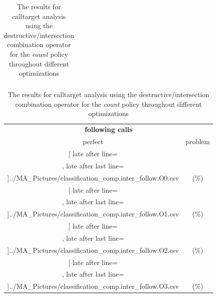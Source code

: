\begin{table}[!htbp]
{\begin{tabular}{l|c|c|c}
    	\end{tabular}

	\begin{tabular}{|c|c}%

	\toprule
    \multicolumn{2}{c}{\bfseries following calls}\\
	
	     perfect &  problem %
	\\\midrule
	\csvreader[ late after line=\\, late after last line=\\\midrule]{../MA_Pictures/classification_comp.inter_follow.O0.csv}{
}
	{\csvcolxiii (\csvcolxiv \%) & \csvcolxv (\csvcolxvi \%)}%
\multicolumn{1}{c}{}

	\\\midrule
	\csvreader[ late after line=\\, late after last line=\\\midrule]{../MA_Pictures/classification_comp.inter_follow.O1.csv}{
}
	{\csvcolxiii (\csvcolxiv \%) & \csvcolxv (\csvcolxvi \%)}%
	
	\multicolumn{1}{c}{}

	\\\midrule
	\csvreader[ late after line=\\, late after last line=\\\midrule]{../MA_Pictures/classification_comp.inter_follow.O2.csv}{
}
	{\csvcolxiii (\csvcolxiv \%) & \csvcolxv (\csvcolxvi \%)}%
	
\multicolumn{1}{c}{}
	\\\midrule
	\csvreader[ late after line=\\, late after last line=\\\bottomrule]{../MA_Pictures/classification_comp.inter_follow.O3.csv}{
}
	{\csvcolxiii (\csvcolxiv \%) & \csvcolxv (\csvcolxvi \%)}%


    	\end{tabular}
}
		\caption {The results for calltarget analysis using the destructive/intersection combination operator for the \textit{count} policy throughout different optimizations}
		\label{tbl:CTdestinterCOUNT}
\end{table}


